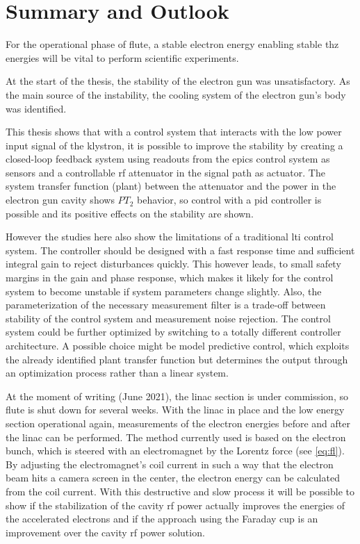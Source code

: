 \chapter{Summary and Outlook}
For the operational phase of \gls{flute}, a stable electron energy enabling stable \gls{thz} energies will be vital to perform scientific experiments.

At the start of the thesis, the stability of the electron gun was unsatisfactory. As the main source of the instability, the cooling system of the electron gun's body was identified.

This thesis shows that with a control system that interacts with the low power input signal of the klystron, it is possible to improve the stability by creating a closed-loop feedback system using readouts from the \gls{epics} control system as sensors and a controllable \gls{rf} attenuator in the signal path as actuator. The system transfer function (plant) between the attenuator and the power in the electron gun cavity shows $PT_2$ behavior, so control with a \gls{pid} controller is possible and its positive effects on the stability are shown.

However the studies here also show the limitations of a traditional \gls{lti} control system. The controller should be designed with a fast response time and sufficient integral gain to reject disturbances quickly. This however leads, to small safety margins in the gain and phase response, which makes it likely for the control system to become unstable if system parameters change slightly. Also, the parameterization of the necessary measurement filter is a trade-off between stability of the control system and measurement noise rejection. The control system could be further optimized by switching to a totally different controller architecture. A possible choice might be model predictive control, which exploits the already identified plant transfer function but determines the output through an optimization process rather than a linear system.

At the moment of writing (June 2021), the \gls{linac} section is under commission, so \gls{flute} is shut down for several weeks. With the \gls{linac} in place and the low energy section operational again, measurements of the electron energies before and after the \gls{linac} can be performed. The method currently used is based on the electron bunch, which is steered with an electromagnet by the Lorentz force (see \autoref{eq:fl}). By adjusting the electromagnet's coil current in such a way that the electron beam hits a camera screen in the center, the electron energy can be calculated from the coil current. With this destructive and slow process it will be possible to show if the stabilization of the cavity \gls{rf} power actually improves the energies of the accelerated electrons and if the approach using the Faraday cup is an improvement over the cavity \gls{rf} power solution.

